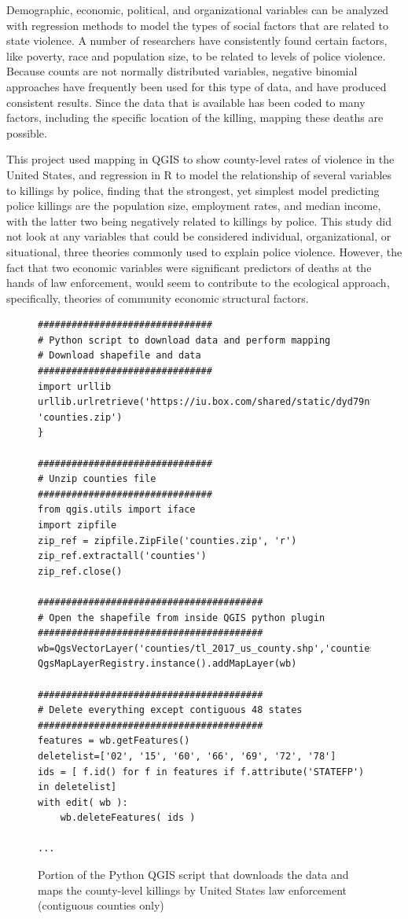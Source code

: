 \documentclass[sigconf]{acmart}
\begin{document}
Demographic, economic, political, and organizational variables can be analyzed with regression methods to model the types of social factors that are related to state violence.  A number of researchers have consistently found certain factors, like poverty, race and population size, to be related to levels of police violence.  Because counts are not normally distributed variables, negative binomial approaches have frequently been used for this type of data, and have produced consistent results.  Since the data that is available has been coded to many factors, including the specific location of the killing, mapping these deaths are possible.  

This project used mapping in QGIS to show county-level rates of violence in the United States, and regression in R to model the relationship of several variables to killings by police, finding that the strongest, yet simplest model predicting police killings are the population size, employment rates, and median income, with the latter two being negatively related to killings by police.  This study did not look at any variables that could be considered individual, organizational, or situational, three theories commonly used to explain police violence.  However, the fact that two economic variables were significant predictors of deaths at the hands of law enforcement, would seem to contribute to the ecological approach, specifically, theories of community economic structural factors.

 

\begin{figure}[htb]
\begin{verbatim}
###############################
# Python script to download data and perform mapping
# Download shapefile and data
###############################
import urllib 
urllib.urlretrieve('https://iu.box.com/shared/static/dyd79nfosj25kdqo4hk0me1tmhrbn275.zip', 'counties.zip')
}

###############################
# Unzip counties file
###############################
from qgis.utils import iface
import zipfile
zip_ref = zipfile.ZipFile('counties.zip', 'r')
zip_ref.extractall('counties')
zip_ref.close()

########################################
# Open the shapefile from inside QGIS python plugin
########################################
wb=QgsVectorLayer('counties/tl_2017_us_county.shp','counties','ogr')
QgsMapLayerRegistry.instance().addMapLayer(wb)

########################################
# Delete everything except contiguous 48 states
########################################
features = wb.getFeatures()
deletelist=['02', '15', '60', '66', '69', '72', '78']
ids = [ f.id() for f in features if f.attribute('STATEFP') in deletelist]
with edit( wb ):
    wb.deleteFeatures( ids )

...
\end{verbatim}
\caption{Portion of the Python QGIS script that downloads the data and maps the county-level killings by United States law enforcement (contiguous counties only)}\label{townsleyP}
\end{figure}
\end{document}
